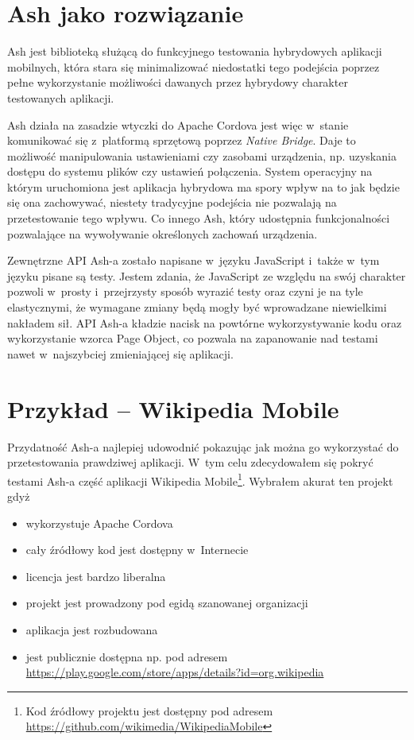 \documentclass[brudnopis]{xmgr}
\begin{document}
                                                                                                                                                                 
\section{Ash jako rozwiązanie}

Ash jest biblioteką służącą do funkcyjnego testowania hybrydowych aplikacji mobilnych, która stara się minimalizować niedostatki tego podejścia poprzez pełne wykorzystanie możliwości dawanych przez hybrydowy charakter testowanych aplikacji. 

Ash działa na zasadzie wtyczki do Apache Cordova jest więc w~stanie komunikować się z~platformą sprzętową poprzez \textit{Native Bridge}. Daje to możliwość manipulowania ustawieniami czy zasobami urządzenia, np. uzyskania dostępu do systemu plików czy ustawień połączenia. System operacyjny na którym uruchomiona jest aplikacja hybrydowa ma spory wpływ na to jak będzie się ona zachowywać, niestety tradycyjne podejścia nie pozwalają na przetestowanie tego wpływu. Co innego Ash, który udostępnia funkcjonalności pozwalające na wywoływanie określonych zachowań urządzenia. 

Zewnętrzne API Ash-a zostało napisane w~języku JavaScript i~także w~tym języku pisane są testy. Jestem zdania, że JavaScript ze względu na swój charakter pozwoli w~prosty i~przejrzysty sposób wyrazić testy oraz czyni je na tyle elastycznymi, że wymagane zmiany będą mogły być wprowadzane niewielkimi nakładem sił. API Ash-a kładzie nacisk na powtórne wykorzystywanie kodu oraz wykorzystanie wzorca Page Object, co pozwala na zapanowanie nad testami nawet w~najszybciej zmieniającej się aplikacji. 

\section{Przykład -- Wikipedia Mobile}

Przydatność Ash-a najlepiej udowodnić pokazując jak można go wykorzystać do przetestowania prawdziwej aplikacji. W~tym celu zdecydowałem się pokryć testami Ash-a część aplikacji Wikipedia Mobile\footnote{Kod źródłowy projektu jest dostępny pod adresem \url{https://github.com/wikimedia/WikipediaMobile} }. Wybrałem akurat ten projekt gdyż

\begin{itemize}
  \item wykorzystuje Apache Cordova
  \item cały źródłowy kod jest dostępny w~Internecie
  \item licencja jest bardzo liberalna
  \item projekt jest prowadzony pod egidą szanowanej organizacji
  \item aplikacja jest rozbudowana
  \item jest publicznie dostępna np. pod adresem \url{https://play.google.com/store/apps/details?id=org.wikipedia}
\end{itemize}
\end{document}
